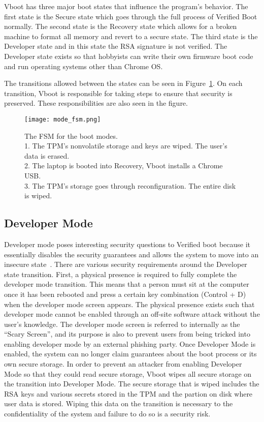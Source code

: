 Vboot has three major boot states that influence the program's behavior.
The first state is the Secure state which goes through the full process of Verified Boot normally.
The second state is the Recovery state which allows for a broken machine to
format all memory and revert to a secure state.
The third state is the Developer state and in this state the RSA signature is not verified.
The Developer state exists so that hobbyists can write their own firmware boot code and run operating systems other than Chrome OS\@.

The transitions allowed between the states can be seen in
Figure~\ref{fig:mode_fsm}.
On each transition, Vboot is responsible for taking steps to ensure that
security is preserved. 
These responsibilities are also seen in the figure.

\begin{figure}
  \centering
  \texttt{[image: mode\_fsm.png]}
  \caption{The FSM for the boot modes. \\
  1. The TPM's nonvolatile storage and keys are wiped. The user's data
  is erased. \\
  2. The laptop is booted into Recovery, Vboot installs a Chrome USB.
  \\
  3. The TPM's storage goes through reconfiguration. The entire disk is wiped.
  \\}\label{fig:mode_fsm}
\end{figure}

\subsection{Developer Mode}

Developer mode poses interesting security questions to Verified boot because it essentially disables the security guarantees and allows the system to move into an insecure state~\cite{developer-mode}. 
There are various security requirements around the Developer state transition.
First, a physical presence is required to fully complete the developer mode transition. 
This means that a person must sit at the computer once it has been rebooted and press a certain key combination (Control + D) when the developer mode screen appears.
The physical presence exists such that developer mode cannot be enabled through an off-site software attack without the user's knowledge.
The developer mode screen is referred to internally as the ``Scary Screen'', and its purpose is also to prevent users from being tricked into enabling developer mode by an external phishing party.
Once Developer Mode is enabled, the system can no longer claim guarantees about the boot process or its own secure storage.
In order to prevent an attacker from enabling Developer Mode so that they could read secure storage, Vboot wipes all secure storage on the transition into Developer Mode.
The secure storage that is wiped includes the RSA keys and various secrets stored in the TPM and the partion on disk where user data is stored.
Wiping this data on the transition is necessary to the confidentiality of the system and failure to do so is a security risk.

